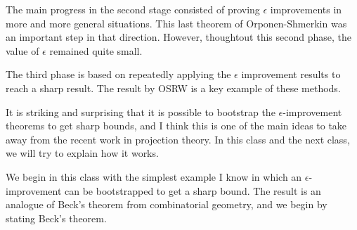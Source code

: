 \documentclass[12pt]{amsart}
\begin{document}
The main progress in the second stage consisted of proving $\epsilon$ improvements in more and more general situations.   This last theorem of Orponen-Shmerkin was an important step in that direction.   However,  thoughtout this second phase,  the value of $\epsilon$ remained quite small.

The third phase is based on repeatedly applying the $\epsilon$ improvement results to reach a sharp result.   The result by OSRW is a key example of these methods.   

It is striking and surprising that it is possible to bootstrap the $\epsilon$-improvement theorems to get sharp bounds,  and I think this is one of the main ideas to take away from the recent work in projection theory.   In this class and the next class,  we will try to explain how it works.

We begin in this class with the simplest example I know in which an $\epsilon$-improvement can be bootstrapped to get a sharp bound.    The result is an analogue of Beck's theorem from combinatorial geometry,  and we begin by stating Beck's theorem.
\end{document}
